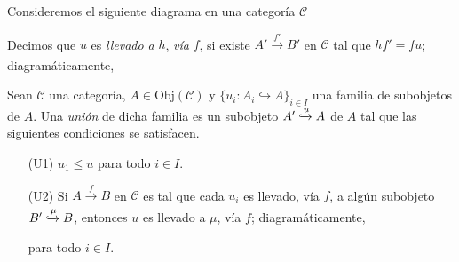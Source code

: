 \documentclass[tesis]{subfiles}
\begin{document}
\begin{Def}
    Consideremos el siguiente diagrama en una categoría $\mathscr{C}$
    \begin{center}
    \end{center}
    Decimos que $u$ es \emph{llevado a} $h$, \emph{vía} $f$, si existe $A'\xrightarrow[]{f'}B'$ en $\mathscr{C}$ tal que $hf' = fu$; diagramáticamente,
    \begin{center}
    \end{center}
\end{Def}

\begin{Def}\label{Def: Unión}
    Sean $\mathscr{C}$ una categoría, $A\in\text{Obj}(\mathscr{C})$ y $\{u_i:A_i\hookrightarrow A\}_{i\in I}$ una familia de subobjetos de $A$. Una \emph{unión} de dicha familia es un subobjeto $A'\xhookrightarrow{u}A$ de $A$ tal que las siguientes condiciones se satisfacen.
    \begin{itemize}
    
        \item[(U1)] $u_1\le u$ para todo $i\in I$.

        \item[(U2)] Si $A\xrightarrow[]{f}B$ en $\mathscr{C}$ es tal que cada $u_i$ es llevado, vía $f$, a algún subobjeto $B'\xhookrightarrow{\mu} B$, entonces $u$ es llevado a $\mu$, vía $f$; diagramáticamente,
            \begin{center}
                \quad para todo $i\in I$.
            \end{center}
    \end{itemize}
\end{Def}
\end{document}
